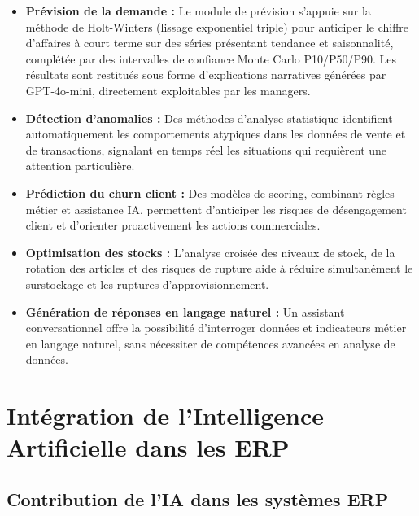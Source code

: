 \documentclass[a4paper,12pt]{report}
\begin{document}
\begin{itemize}
    \item \textbf{Prévision de la demande :} Le module de prévision s'appuie sur la méthode de Holt-Winters (lissage exponentiel triple) pour anticiper le chiffre d'affaires à court terme sur des séries présentant tendance et saisonnalité, complétée par des intervalles de confiance Monte Carlo P10/P50/P90. Les résultats sont restitués sous forme d'explications narratives générées par GPT-4o-mini, directement exploitables par les managers.

    \item \textbf{Détection d'anomalies :} Des méthodes d'analyse statistique identifient automatiquement les comportements atypiques dans les données de vente et de transactions, signalant en temps réel les situations qui requièrent une attention particulière.

    \item \textbf{Prédiction du churn client :} Des modèles de scoring, combinant règles métier et assistance IA, permettent d'anticiper les risques de désengagement client et d'orienter proactivement les actions commerciales.

    \item \textbf{Optimisation des stocks :} L'analyse croisée des niveaux de stock, de la rotation des articles et des risques de rupture aide à réduire simultanément le surstockage et les ruptures d'approvisionnement.

    \item \textbf{Génération de réponses en langage naturel :} Un assistant conversationnel offre la possibilité d'interroger données et indicateurs métier en langage naturel, sans nécessiter de compétences avancées en analyse de données.
\end{itemize}


\section{Intégration de l'Intelligence Artificielle dans les ERP}

\subsection{Contribution de l'IA dans les systèmes ERP}
\end{document}
